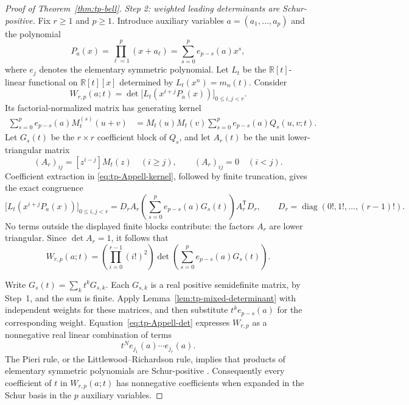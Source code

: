 \documentclass[11pt,a4paper]{article}
\theoremstyle{definition}
\theoremstyle{remark}
\numberwithin{equation}{section}
\begin{document}
\begin{proof}[Proof of Theorem~\ref{thm:tp-bell}]
\smallskip\noindent
\emph{Step 2: weighted leading determinants are Schur-positive.}
Fix $r\geq1$ and $p\geq1$.  Introduce auxiliary variables
$a=(a_1,\ldots,a_p)$ and the polynomial
\[
 P_a(x)=\prod_{\ell=1}^p(x+a_\ell)
       =\sum_{s=0}^p e_{p-s}(a)x^s,
\]
where $e_j$ denotes the elementary symmetric polynomial.  Let $L_t$ be
the $\mathbb R[t]$-linear functional on $\mathbb R[t][x]$ determined by
$L_t(x^n)=m_n(t)$.  Consider
\begin{equation}
 W_{r,p}(a;t)=
 \det\bigl[L_t(x^{i+j}P_a(x))\bigr]_{0\leq i,j<r}.
 \label{eq:tp-weighted-det}
\end{equation}
Its factorial-normalized matrix has generating kernel
\begin{align}
 \sum_{s=0}^p e_{p-s}(a)M_t^{(s)}(u+v)
 &=M_t(u)M_t(v)\sum_{s=0}^p e_{p-s}(a)Q_s(u,v;t).
 \label{eq:tp-Appell-kernel}
\end{align}
Let $G_s(t)$ be the $r\times r$ coefficient block of $Q_s$, and let
$A_r(t)$ be the unit lower-triangular matrix
\[
 (A_r)_{ij}=[z^{i-j}]M_t(z)\quad(i\geq j),
 \qquad (A_r)_{ij}=0\quad(i<j).
\]
Coefficient extraction in \eqref{eq:tp-Appell-kernel}, followed by
finite truncation, gives the exact congruence
\[
 \bigl[L_t(x^{i+j}P_a(x))\bigr]_{0\leq i,j<r}
 =D_rA_r\left(\sum_{s=0}^p e_{p-s}(a)G_s(t)\right)A_r^{\mathsf T}D_r,
 \qquad D_r=\operatorname{diag}(0!,1!,\ldots,(r-1)!).
\]
No terms outside the displayed finite blocks contribute: the factors
$A_r$ are lower triangular.  Since $\det A_r=1$, it follows that
\begin{equation}
 W_{r,p}(a;t)=\left(\prod_{i=0}^{r-1}(i!)^2\right)
 \det\left(\sum_{s=0}^p e_{p-s}(a)G_s(t)\right).
 \label{eq:tp-Appell-det}
\end{equation}

Write $G_s(t)=\sum_k t^kG_{s,k}$.  Each $G_{s,k}$ is a real positive
semidefinite matrix, by Step~1, and the sum is finite.  Apply
Lemma~\ref{lem:tp-mixed-determinant} with independent weights for these
matrices, and then substitute $t^ke_{p-s}(a)$ for the corresponding
weight.  Equation~\eqref{eq:tp-Appell-det} expresses $W_{r,p}$ as a
nonnegative real linear combination of terms
\[
 t^N e_{j_1}(a)\cdots e_{j_r}(a).
\]
The Pieri rule, or the Littlewood--Richardson rule, implies that products
of elementary symmetric polynomials are Schur-positive
\cite[Chapter~I]{Macdonald1995}.  Consequently every coefficient of $t$
in $W_{r,p}(a;t)$ has nonnegative coefficients when expanded in the Schur
basis in the $p$ auxiliary variables.


\end{proof}
\end{document}
